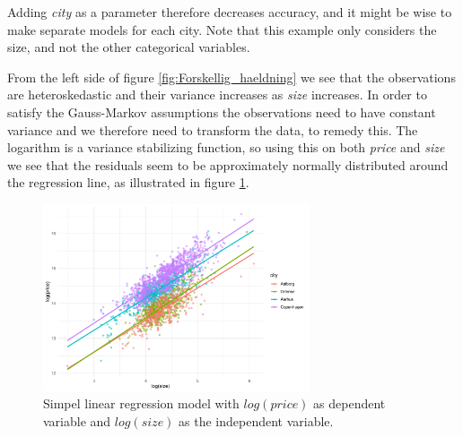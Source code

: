 Adding \textit{city} as a parameter therefore decreases accuracy, and it might be wise to make separate models for each city. 
Note that this example only considers the size, and not the other categorical variables.



From the left side of figure \ref{fig:Forskellig_haeldning} we see that the observations are heteroskedastic and their variance increases as \textit{size} increases. 
In order to satisfy the Gauss-Markov assumptions the observations need to have constant variance and we therefore need to transform the data, to remedy this. 
The logarithm is a variance stabilizing function, so using this on both \textit{price} and \textit{size} we see that the residuals seem to be approximately normally distributed around the regression line, as illustrated in figure \ref{fig:Log_Model_plot}. 

\begin{figure}[H] 
    \centering
    \includegraphics[width = 0.7\textwidth]{figures/Nanna/Plot_forskellig_haeldning.pdf}
    \caption{Simpel linear regression model with $log(price)$ as dependent variable and $log(size)$ as the independent variable.}
    \label{fig:Log_Model_plot}
\end{figure}

